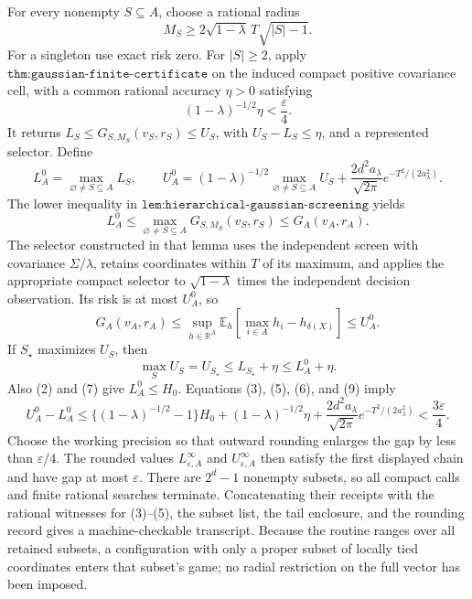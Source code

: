 For every nonempty \(S\subseteq A\), choose a rational radius
\[
M_S\geq2\sqrt{1-\lambda}\,T\sqrt{|S|-1}.                          \tag{4}
\]
For a singleton use exact risk zero.  For \(|S|\geq2\), apply \(\texttt{thm:gaussian-finite-certificate}\) on the induced compact positive covariance cell, with a common rational accuracy \(\eta>0\) satisfying
\[
(1-\lambda)^{-1/2}\eta<\frac\varepsilon4.                         \tag{5}
\]
It returns \(L_S\leq G_{S,M_S}(v_S,r_S)\leq U_S\), with \(U_S-L_S\leq\eta\), and a represented selector.  Define
\[
L_A^0=\max_{\varnothing\ne S\subseteq A}L_S,
\qquad
U_A^0=(1-\lambda)^{-1/2}\max_{\varnothing\ne S\subseteq A}U_S
+\frac{2d^2a_\lambda}{\sqrt{2\pi}}e^{-T^2/(2a_\lambda^2)}.       \tag{6}
\]
The lower inequality in \(\texttt{lem:hierarchical-gaussian-screening}\) yields
\[
L_A^0\leq\max_{\varnothing\ne S\subseteq A}G_{S,M_S}(v_S,r_S)
\leq G_A(v_A,r_A).                                                 \tag{7}
\]
The selector constructed in that lemma uses the independent screen with covariance \(\Sigma/\lambda\), retains coordinates within \(T\) of its maximum, and applies the appropriate compact selector to \(\sqrt{1-\lambda}\) times the independent decision observation.  Its risk is at most \(U_A^0\), so
\[
G_A(v_A,r_A)\leq
\sup_{h\in\mathbb R^A}\mathbb E_h\!\left[\max_{i\in A}h_i-h_{\delta(X)}\right]
\leq U_A^0.                                                        \tag{8}
\]
If \(S_\star\) maximizes \(U_S\), then
\[
\max_SU_S=U_{S_\star}\leq L_{S_\star}+\eta\leq L_A^0+\eta.      \tag{9}
\]
Also (2) and (7) give \(L_A^0\leq H_0\).  Equations (3), (5), (6), and (9) imply
\[
U_A^0-L_A^0
\leq\{(1-\lambda)^{-1/2}-1\}H_0+(1-\lambda)^{-1/2}\eta
+\frac{2d^2a_\lambda}{\sqrt{2\pi}}e^{-T^2/(2a_\lambda^2)}
<\frac{3\varepsilon}{4}.                                         \tag{10}
\]
Choose the working precision so that outward rounding enlarges the gap by less than \(\varepsilon/4\).  The rounded values \(L^\infty_{\varepsilon,A}\) and \(U^\infty_{\varepsilon,A}\) then satisfy the first displayed chain and have gap at most \(\varepsilon\).  There are \(2^d-1\) nonempty subsets, so all compact calls and finite rational searches terminate.  Concatenating their receipts with the rational witnesses for (3)--(5), the subset list, the tail enclosure, and the rounding record gives a machine-checkable transcript.  Because the routine ranges over all retained subsets, a configuration with only a proper subset of locally tied coordinates enters that subset's game; no radial restriction on the full vector has been imposed.

